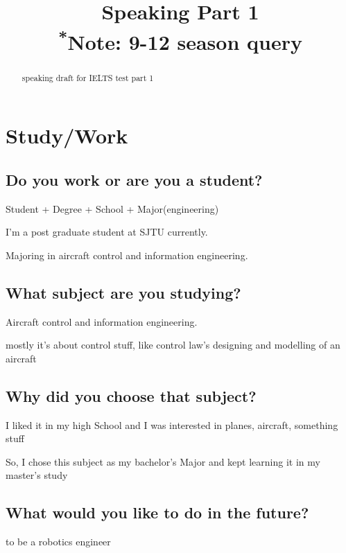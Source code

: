 \documentclass[conference]{IEEEtran}
\begin{document}
\title{Speaking Part 1\\
{\footnotesize \textsuperscript{*}Note:
9-12 season query}
}

\author{
}

\maketitle

\begin{abstract}
speaking draft for IELTS test part 1
\end{abstract}


\section{Study/Work}

\subsection{Do you work or are you a student?}
Student + Degree + School + Major(engineering)

I'm a post graduate student at SJTU currently.

Majoring in aircraft control and information engineering. 


\subsection{What subject are you studying?}
Aircraft control and information engineering.

mostly it's about control stuff, like control law's designing and modelling of an aircraft

\subsection{Why did you choose that subject?}
I liked it in my high School and I was interested in planes, aircraft, something stuff

So, I chose this subject as my bachelor's Major and kept learning it in my master's study



\subsection{What would you like to do in the future?}
to be a robotics engineer
\end{document}
